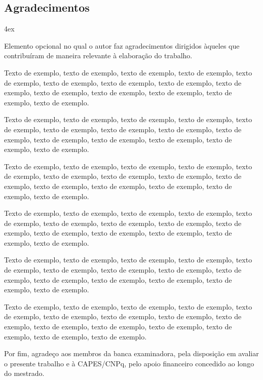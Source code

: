 \clearpage
\setcounter{page}{6}
\begin{center}
\chapter*{Agradecimentos}
\end{center}
\vspace*{1cm}
\begin{trivlist}  \itemsep 4ex  \normalsize
%
\item Elemento opcional no qual o autor faz agradecimentos dirigidos àqueles que contribuíram de maneira relevante à elaboração do trabalho.

\item Texto de exemplo, texto de exemplo, texto de exemplo, texto de exemplo, texto de exemplo, texto de exemplo, texto de exemplo, texto de exemplo, texto de exemplo, texto de exemplo, texto de exemplo, texto de exemplo, texto de exemplo, texto de exemplo.
 
\item Texto de exemplo, texto de exemplo, texto de exemplo, texto de exemplo, texto de exemplo, texto de exemplo, texto de exemplo, texto de exemplo, texto de exemplo, texto de exemplo, texto de exemplo, texto de exemplo, texto de exemplo, texto de exemplo.

\item Texto de exemplo, texto de exemplo, texto de exemplo, texto de exemplo, texto de exemplo, texto de exemplo, texto de exemplo, texto de exemplo, texto de exemplo, texto de exemplo, texto de exemplo, texto de exemplo, texto de exemplo, texto de exemplo.

\item Texto de exemplo, texto de exemplo, texto de exemplo, texto de exemplo, texto de exemplo, texto de exemplo, texto de exemplo, texto de exemplo, texto de exemplo, texto de exemplo, texto de exemplo, texto de exemplo, texto de exemplo, texto de exemplo.

\item Texto de exemplo, texto de exemplo, texto de exemplo, texto de exemplo, texto de exemplo, texto de exemplo, texto de exemplo, texto de exemplo, texto de exemplo, texto de exemplo, texto de exemplo, texto de exemplo, texto de exemplo, texto de exemplo.

\item Texto de exemplo, texto de exemplo, texto de exemplo, texto de exemplo, texto de exemplo, texto de exemplo, texto de exemplo, texto de exemplo, texto de exemplo, texto de exemplo, texto de exemplo, texto de exemplo, texto de exemplo, texto de exemplo, texto de exemplo.

\item Por fim, agradeço aos membros da banca examinadora, pela disposição em avaliar o presente trabalho e à CAPES/CNPq, pelo apoio financeiro concedido ao longo do mestrado.

\end{trivlist}